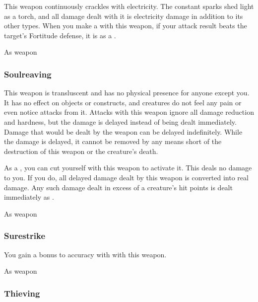 This weapon continuously crackles with electricity.
The constant sparks shed light as a torch, and all damage dealt with it is electricity damage in addition to its other types.
When you make a  with this weapon, if your attack result beats the target's Fortitude defense, it is \dazed as a .



 


 As weapon


\lowercase{\hypertarget{item:Soulreaving}{}}\label{item:Soulreaving}
\hypertarget{item:Soulreaving}{\subsubsection{Soulreaving\hfill{}}}

This weapon is transluscent and has no physical presence for anyone except you.
It has no effect on objects or constructs, and creatures do not feel any pain or even notice attacks from it.
Attacks with this weapon ignore all damage reduction and hardness, but the damage is delayed instead of being dealt immediately.
Damage that would be dealt by the weapon can be delayed indefinitely.
While the damage is delayed, it cannot be removed by any means short of the destruction of this weapon or the creature's death.

As a , you can cut yourself with this weapon to activate it.
This deals no damage to you.
If you do, all delayed damage dealt by this weapon is converted into real damage.
Any such damage dealt in excess of a creature's hit points is dealt immediately as .



 As weapon


\lowercase{\hypertarget{item:Surestrike}{}}\label{item:Surestrike}
\hypertarget{item:Surestrike}{\subsubsection{Surestrike\hfill{}}}

You gain a  bonus to accuracy with  with this weapon.



 


 As weapon


\lowercase{\hypertarget{item:Thieving}{}}\label{item:Thieving}
\hypertarget{item:Thieving}{\subsubsection{Thieving\hfill{}}}

